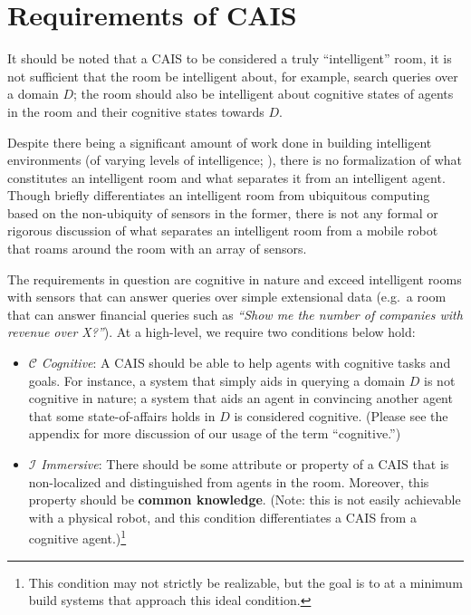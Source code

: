 \section{Requirements of CAIS}\label{ref:requirements_cais}

It should be noted that a CAIS to be considered a truly ``intelligent''
room, it is not sufficient that the room be intelligent about, for
example, search queries over a domain $D$; the room should also be
intelligent about cognitive states of agents in the room and their
cognitive states towards $D$.

Despite there being a significant amount of work done in building
intelligent environments (of varying levels of intelligence;
\cite{coen_design_1998,brooks_intelligent_1997,chan_review_2008}), there
is no formalization of what constitutes an intelligent room and what
separates it from an intelligent agent.  Though \cite{coen_design_1998}
briefly differentiates an intelligent room from ubiquitous computing
based on the non-ubiquity of sensors in the former, there is not any
formal or rigorous discussion of what separates an intelligent room
from a mobile robot that roams around the room with an array of
sensors.

The requirements in question are cognitive in nature and exceed
intelligent rooms with sensors that can answer queries over simple
extensional data (e.g.\ a room that can answer financial queries such
as \textit{``Show me the number of companies with revenue over X?''}).
At a high-level, we require two conditions below hold:

\begin{itemize}
    \item $\mathcal{C}$ \emph{Cognitive}: A CAIS should be able to
      help agents with cognitive tasks and goals.  For instance, a
      system that simply aids in querying a domain $D$ is not
      cognitive in nature; a system that aids an agent in convincing
      another agent that some state-of-affairs holds in $D$ is
      considered cognitive. (Please see the appendix for more
      discussion of our usage of the term ``cognitive.'')
    \item $\mathcal{I}$ \emph{Immersive}:  There should
      be some attribute or property of a CAIS that is non-localized
      and distinguished from agents in the room.  Moreover, this
      property should be \textbf{common knowledge}.  (Note: this is
      not easily achievable with a physical robot, and this condition
      differentiates a CAIS from a cognitive
      agent.)\footnote{This condition may not strictly be realizable,
        but the goal is to at a minimum build systems that approach
        this ideal condition.}
\end{itemize}